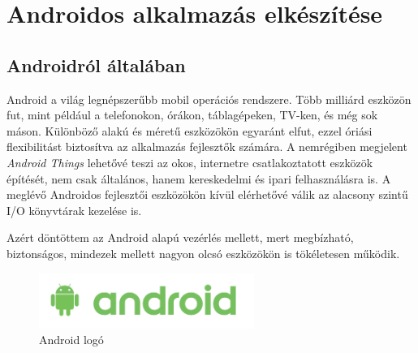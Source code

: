 \documentclass[../main.tex]{subfiles}
\begin{document}
\section{Androidos alkalmazás elkészítése}
    \subsection{Androidról általában}
        Android a világ legnépszerűbb mobil operációs rendszere. Több milliárd eszközön fut, mint például a telefonokon, órákon, táblagépeken, TV-ken, és még sok máson. 
        Különböző alakú és méretű eszközökön egyaránt elfut, ezzel óriási flexibilitást biztosítva az alkalmazás fejlesztők számára. 
        A nemrégiben megjelent \textit{Android Things} lehetővé teszi az okos, internetre csatlakoztatott eszközök építését, nem csak általános, hanem kereskedelmi és ipari felhasználásra is. A meglévő Androidos fejlesztői eszközökön kívül elérhetővé válik az alacsony szintű I/O könyvtárak kezelése is. 
        
        Azért döntöttem az Android alapú vezérlés mellett, mert megbízható, biztonságos, mindezek mellett nagyon olcsó eszközökön is tökéletesen működik. 
        
        \begin{figure}[h!]
            \centering
            \includegraphics[width=7cm]{android_res/android_logo.png}
            \caption{Android logó}
            \label{fig:android_logo}
        \end{figure}
        
\end{document}
